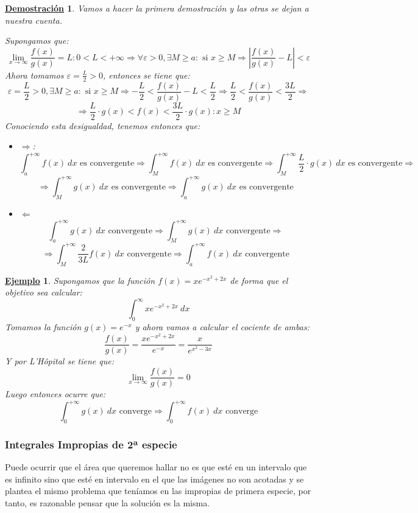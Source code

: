 \documentclass[10pt,a4paper,openright]{book}
\theoremstyle{break}
\newtheorem*{demo}{\underline{Demostración}}
\newtheorem{ej}{\underline{Ejemplo}}[chapter]
\newcommand{\dif}[1]{\ d#1}
\begin{document}
\begin{demo}
Vamos a hacer la primera demostración y las otras se dejan a nuestra cuenta.

Supongamos que:
$$\lim_{x \to \infty} \frac{f(x)}{g(x)} = L : 0 < L < +\infty\Rightarrow \forall \varepsilon > 0, \exists M \geq a: \mbox{ si } x \geq M \Rightarrow \left| \frac{f(x)}{g(x)} - L\right| < \varepsilon$$
Ahora tomamos $\varepsilon = \frac{L}{2} > 0$, entonces se tiene que:
$$ \varepsilon = \frac{L}{2}> 0, \exists M \geq a: \mbox{ si } x \geq M \Rightarrow -\frac{L}{2} < \frac{f(x)}{g(x)} - L < \frac{L}{2} \Rightarrow \frac{L}{2} < \frac{f(x)}{g(x)} < \frac{3L}{2}\Rightarrow$$
$$\Rightarrow \frac{L}{2} \cdot g(x) < f(x) <  \frac{3L}{2} \cdot g(x) : x\geq M$$
Conociendo esta desigualdad, tenemos entonces que:
\begin{itemize}
\item $\Rightarrow $:
$$\int_{a}^{+\infty} f(x)\dif{x}\mbox{ es convergente}\Rightarrow \int_{M}^{+\infty} f(x)\dif{x}\mbox{ es convergente}\Rightarrow \int_{M}^{+\infty} \frac{L}{2} \cdot g(x)\dif{x}\mbox{ es convergente}\Rightarrow$$
$$\Rightarrow \int_{M}^{+\infty} g(x)\dif{x} \mbox{ es convergente}\Rightarrow \int_{a}^{+\infty} g(x)\dif{x}\mbox{ es convergente}$$
\item $\Leftarrow$
$$\int_{a}^{+\infty} g(x)\dif{x} \mbox{ convergente}\Rightarrow \int_{M}^{+\infty} g(x)\dif{x} \mbox{ convergente}\Rightarrow$$
$$\Rightarrow \int_{M}^{+\infty} \frac{2}{3L} f(x)\dif{x} \mbox{ convergente} \Rightarrow \int_{a}^{+\infty} f(x)\dif{x} \mbox{ convergente}$$
\end{itemize}
\end{demo}

\begin{ej}
Supongamos que la función $f(x) = xe^{-x^2+2x}$ de forma que el objetivo sea calcular:
$$\int_{0}^{\infty} x e^{-x^2+2x} \dif{x}$$
Tomamos la función $g(x) = e^{-x}$ y ahora vamos a calcular el cociente de ambas:
$$\frac{f(x)}{g(x)} = \frac{xe^{-x^2+2x}}{e^{-x}} = \frac{x}{e^{x^2-3x}}$$
Y por L'Hôpital se tiene que:
$$\lim_{x \rightarrow \infty} \frac{f(x)}{g(x)} = 0$$
Luego entonces ocurre que:
$$\int_{0}^{+\infty} g(x)\dif{x}\mbox{ converge}\Rightarrow \int_{0}^{+\infty} f(x)\dif{x}\mbox{ converge}$$
\end{ej}

\subsubsection{Integrales Impropias de 2ª especie}
Puede ocurrir que el área que queremos hallar no es que esté en un intervalo que es infinito sino que esté en intervalo en el que las imágenes no son acotadas y se plantea el mismo problema que teníamos en las impropias de primera especie, por tanto, es razonable pensar que la solución es la misma.
\end{document}
